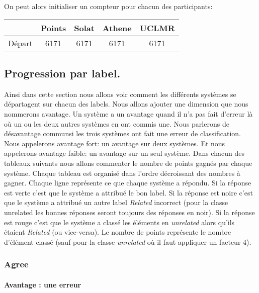 \documentclass[onecolumn, 12pt]{article}
\begin{document}
 On peut alors initialiser un compteur pour chacun des participants:
 \begin{center}
  \begin{tabular}{ r | c || c c c }
           & Points & Solat & Athene & UCLMR \\ \hline
   Départ & 6171   & 6171  & 6171   & 6171  \\
  \end{tabular}
 \end{center}
 
 
 \subsection{Progression par label.}
 Ainsi dans cette section nous allons voir comment les différents systèmes se départagent sur chacun des labels.
 Nous allons ajouter une dimension que nous nommerons \og avantage\fg.
 Un système a un avantage quand il n'a pas fait d'erreur là où un ou les deux autres systèmes en ont commis une.
 Nous parlerons de \og désavantage commun\fg si les trois systèmes ont fait une erreur de classification.
 Nous appelerons \og avantage fort\fg: un avantage sur deux systèmes.
 Et nous appelerons \og avantage faible\fg: un avantage sur un seul système.
 Dans chacun des tableaux suivants nous allons commenter le nombre de points gagnés par chaque système.
 Chaque tableau est organisé dans l'ordre décroissant des nombres à gagner.
 Chaque ligne représente ce que chaque système a répondu.
 Si la réponse est verte c'est que le système a attribué le bon label.
 Si la réponse est noire c'est que le système a attribué un autre label \textit{Related} incorrect (pour la classe unrelated les bonnes réponses seront toujours des réponses en noir).
 Si la réponse est rouge c'est que le système a classé les éléments en \textit{unrelated} alors qu'ils étaient \textit{Related} (ou vice-versa).
 Le nombre de points représente le nombre d'élément classé (sauf pour la classe \textit{unrelated} où il faut appliquer un facteur 4).
 
 \subsubsection{Agree}
 \paragraph{Avantage : une erreur}
 
 
\end{document}
